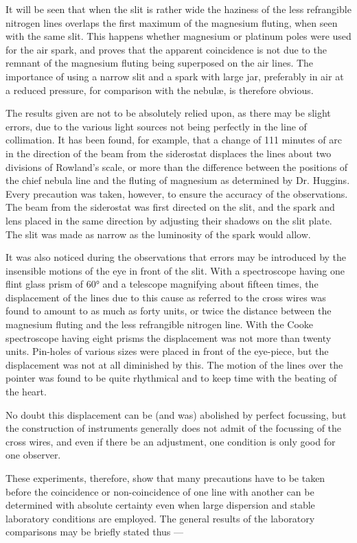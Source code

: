 \documentclass[a4paper, 12pt, oneside, polutonikogreek, english]{article}
\begin{document}
It will be seen that when the slit is rather wide the haziness of the less refrangible nitrogen lines overlaps the first maximum of the magnesium fluting, when seen with the same slit. This happens whether magnesium or platinum poles were used for the air spark, and proves that the apparent coincidence is not due to the remnant of the magnesium fluting being superposed on the air lines. The importance of using a narrow slit and a spark with large jar, preferably in air at a reduced pressure, for comparison with the nebulæ, is therefore obvious.

The results given are not to be absolutely relied upon, as there may be slight errors, due to the various light sources not being perfectly in the line of collimation. It has been found, for example, that a change of 111 minutes of arc in the direction of the beam from the siderostat displaces the lines about two divisions of Rowland's scale, or more than the difference between the positions of the chief nebula line and the fluting of magnesium as determined by Dr. Huggins. Every precaution was taken, however, to ensure the accuracy of the observations. The beam from the siderostat was first directed on the slit, and the spark and lens placed in the same direction by adjusting their shadows on the slit plate. The slit was made as narrow as the luminosity of the spark would allow.

It was also noticed during the observations that errors may be introduced by the insensible motions of the eye in front of the slit. With a spectroscope having one flint glass prism of 60° and a telescope magnifying about fifteen times, the displacement of the lines due to this cause as referred to the cross wires was found to amount to as much as forty units, or twice the distance between the magnesium fluting and the less refrangible nitrogen line. With the Cooke spectroscope having eight prisms the displacement was not more than twenty units. Pin-holes of various sizes were placed in front of the eye-piece, but the displacement was not at all diminished by this. The motion of the lines over the pointer was found to be quite rhythmical and to keep time with the beating of the heart.

No doubt this displacement can be (and was) abolished by perfect focussing, but the construction of instruments generally does not admit of the focussing of the cross wires, and even if there be an adjustment, one condition is only good for one observer.

These experiments, therefore, show that many precautions have to be taken before the coincidence or non-coincidence of one line with another can be determined with absolute certainty even when large dispersion and stable laboratory conditions are employed. The general results of the laboratory comparisons may be briefly stated thus ---
\end{document}

